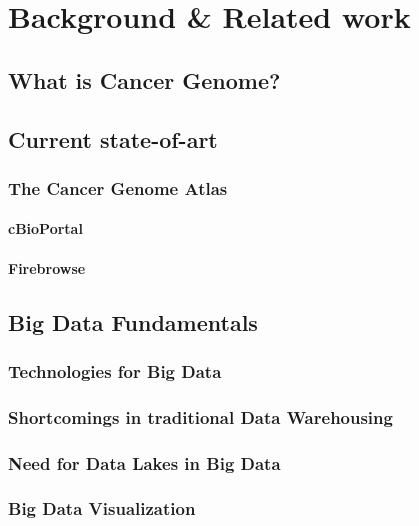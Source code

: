 %

\chapter{Background \& Related work}
\label{relatedwork}
\section{What is Cancer Genome?}
\section{Current state-of-art}
\subsection{The Cancer Genome Atlas}
\label{relatedwork.tcga}
\subsubsection{cBioPortal}
\label{relatedwork.cbioportal}
\subsubsection{Firebrowse}
\label{relatedework.firebrowse}
\section{Big Data Fundamentals}
\label{relatedework.fundamentals}
\subsection{Technologies for Big Data}
\label{relatedework.technologies}
\subsection{Shortcomings in traditional Data Warehousing}
\label{relatedework.tdw}
\subsection{Need for Data Lakes in Big Data}
\label{relatedework.datalake}
\subsection{Big Data Visualization}
\label{relatedework.visualization}